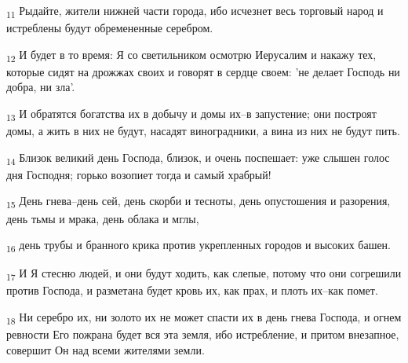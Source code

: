 \begin{tcolorbox}
\textsubscript{11} Рыдайте, жители нижней части города, ибо исчезнет весь торговый народ и истреблены будут обремененные серебром.
\end{tcolorbox}
\begin{tcolorbox}
\textsubscript{12} И будет в то время: Я со светильником осмотрю Иерусалим и накажу тех, которые сидят на дрожжах своих и говорят в сердце своем: 'не делает Господь ни добра, ни зла'.
\end{tcolorbox}
\begin{tcolorbox}
\textsubscript{13} И обратятся богатства их в добычу и домы их--в запустение; они построят домы, а жить в них не будут, насадят виноградники, а вина из них не будут пить.
\end{tcolorbox}
\begin{tcolorbox}
\textsubscript{14} Близок великий день Господа, близок, и очень поспешает: уже слышен голос дня Господня; горько возопиет тогда и самый храбрый!
\end{tcolorbox}
\begin{tcolorbox}
\textsubscript{15} День гнева--день сей, день скорби и тесноты, день опустошения и разорения, день тьмы и мрака, день облака и мглы,
\end{tcolorbox}
\begin{tcolorbox}
\textsubscript{16} день трубы и бранного крика против укрепленных городов и высоких башен.
\end{tcolorbox}
\begin{tcolorbox}
\textsubscript{17} И Я стесню людей, и они будут ходить, как слепые, потому что они согрешили против Господа, и разметана будет кровь их, как прах, и плоть их--как помет.
\end{tcolorbox}
\begin{tcolorbox}
\textsubscript{18} Ни серебро их, ни золото их не может спасти их в день гнева Господа, и огнем ревности Его пожрана будет вся эта земля, ибо истребление, и притом внезапное, совершит Он над всеми жителями земли.
\end{tcolorbox}
